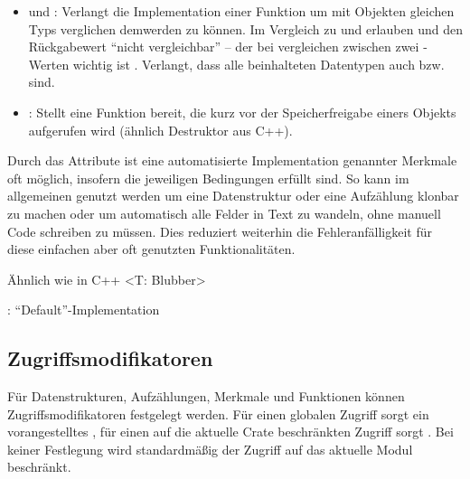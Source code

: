 \begin{itemize}
	\item {} und : Verlangt die Implementation einer Funktion um mit Objekten gleichen Typs verglichen demwerden zu können. Im Vergleich zu  und  erlauben  und  den Rückgabewert \enquote{nicht vergleichbar} -- der bei  vergleichen zwischen zwei -Werten wichtig ist . Verlangt, dass alle beinhalteten Datentypen auch  bzw.  sind.
	\item {}: Stellt eine Funktion bereit, die kurz vor der Speicherfreigabe einers Objekts aufgerufen wird (ähnlich Destruktor aus C++).
\end{itemize}

Durch das Attribute \rustcinline{#[derive(..)]} ist eine automatisierte Implementation genannter Merkmale oft möglich, insofern die jeweiligen Bedingungen erfüllt sind.
So kann im allgemeinen  genutzt werden um eine Datenstruktur oder eine Aufzählung klonbar zu machen oder  um automatisch alle Felder in Text zu wandeln, ohne manuell Code schreiben zu müssen.
Dies reduziert weiterhin die Fehleranfälligkeit für diese einfachen aber oft genutzten Funktionalitäten.

Ähnlich wie in C++ <T: Blubber>


: \enquote{Default}-Implementation



\subsection{Zugriffsmodifikatoren}
\label{rust:access_modifier}

Für Datenstrukturen, Aufzählungen, Merkmale und Funktionen können Zugriffsmodifikatoren festgelegt werden.
Für einen globalen Zugriff sorgt ein vorangestelltes , für einen auf die aktuelle Crate beschränkten Zugriff sorgt .
Bei keiner Festlegung wird standardmäßig der Zugriff auf das aktuelle Modul beschränkt.


